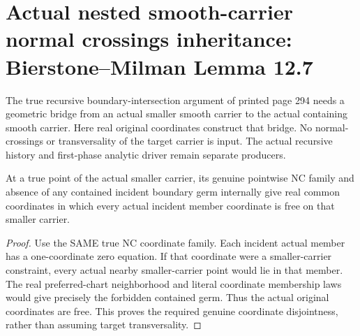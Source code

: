\section{Actual nested smooth-carrier normal crossings inheritance: Bierstone--Milman Lemma 12.7}

The true recursive boundary-intersection argument of printed page 294 needs a
geometric bridge from an actual smaller smooth carrier to the actual containing
smooth carrier. Here real original coordinates construct that bridge. No
normal-crossings or transversality of the target carrier is input. The actual
recursive history and first-phase analytic driver remain separate producers.

\begin{lemma}
\label{hir:sharp-nested-smaller-carrier-noncontained-germs-free-boundary-coordinates}
\leanok
At a true point of the actual smaller carrier, its genuine pointwise NC family
and absence of any contained incident boundary germ internally give real common
coordinates in which every actual incident member coordinate is free on that
smaller carrier.
\end{lemma}
\begin{proof}
Use the SAME true NC coordinate family. Each incident actual member has a
one-coordinate zero equation. If that coordinate were a smaller-carrier
constraint, every actual nearby smaller-carrier point would lie in that
member. The real preferred-chart neighborhood and literal coordinate
membership laws would give precisely the forbidden contained germ. Thus the
actual original coordinates are free. This proves the required genuine
coordinate disjointness, rather than assuming target transversality.
\end{proof}

